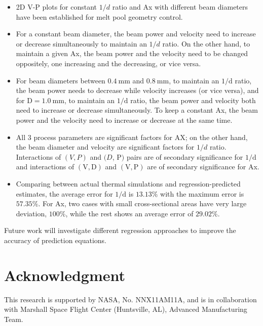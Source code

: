 \documentclass[10pt]{article}
\begin{document}
\begin{itemize}
  \item 2D V-P plots for constant $1 / d$ ratio and Ax with different beam diameters have been established for melt pool geometry control.

  \item For a constant beam diameter, the beam power and velocity need to increase or decrease simultaneously to maintain an $1 / d$ ratio. On the other hand, to maintain a given Ax, the beam power and the velocity need to be changed oppositely, one increasing and the decreasing, or vice versa.

  \item For beam diameters between $0.4 \mathrm{~mm}$ and $0.8 \mathrm{~mm}$, to maintain an $1 / \mathrm{d}$ ratio, the beam power needs to decrease while velocity increases (or vice versa), and for $\mathrm{D}=1.0 \mathrm{~mm}$, to maintain an $1 / \mathrm{d}$ ratio, the beam power and velocity both need to increase or decrease simultaneously. To keep a constant Ax, the beam power and the velocity need to increase or decrease at the same time.

  \item All 3 process parameters are significant factors for AX; on the other hand, the beam diameter and velocity are significant factors for $1 / d$ ratio. Interactions of $(V, P)$ and $(D$, $\mathrm{P})$ pairs are of secondary significance for $1 / \mathrm{d}$ and interactions of $(\mathrm{V}, \mathrm{D})$ and $(\mathrm{V}, \mathrm{P})$ are of secondary significance for Ax.

  \item Comparing between actual thermal simulations and regression-predicted estimates, the average error for $1 / \mathrm{d}$ is $13.13 \%$ with the maximum error is $57.35 \%$. For Ax, two cases with small cross-sectional areas have very large deviation, $100 \%$, while the rest shows an average error of $29.02 \%$.

\end{itemize}

Future work will investigate different regression approaches to improve the accuracy of prediction equations.

\section*{Acknowledgment}
This research is supported by NASA, No. NNX11AM11A, and is in collaboration with Marshall Space Flight Center (Huntsville, AL), Advanced Manufacturing Team.
\end{document}
